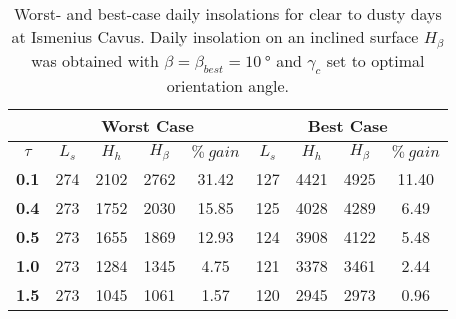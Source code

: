 \begin{table}[h]
\footnotesize
\centering
\caption[Worst- and best-case daily insolations for clear to dusty days at Ismenius Cavus]
{Worst- and best-case daily insolations for clear to dusty days at Ismenius Cavus. Daily insolation on an inclined surface $H_{\beta}$ was obtained with $\beta = \beta_{best} = \SI{10}{\degree}$ and $\gamma_{c}$ set to optimal orientation angle.}
\label{tab:insolation-ismenius-cavus-clear-and-dusty-days}
\begin{tabular}{c|c|c|c|c|c|c|c|c|}
\cline{2-9}
\multicolumn{1}{l|}{} & \multicolumn{4}{c|}{\textbf{Worst Case}} & \multicolumn{4}{c|}{\textbf{Best Case}} \\ \hline
\multicolumn{1}{|c|}{$\tau$} & $L_{s}$ & $H_{h}$ & $H_{\beta}$ & $\%\:gain$ & $L_{s}$ & $H_{h}$ & $H_{\beta}$ & $\%\:gain$ \\ \hline
\multicolumn{1}{|c|}{\textbf{0.1}} & 274 & 2102 & 2762 & 31.42 & 127 & 4421 & 4925 & 11.40 \\ \hline
\multicolumn{1}{|c|}{\textbf{0.4}} & 273 & 1752 & 2030 & 15.85 & 125 & 4028 & 4289 & 6.49 \\ \hline
\multicolumn{1}{|c|}{\textbf{0.5}} & 273 & 1655 & 1869 & 12.93 & 124 & 3908 & 4122 & 5.48 \\ \hline
\multicolumn{1}{|c|}{\textbf{1.0}} & 273 & 1284 & 1345 & 4.75 & 121 & 3378 & 3461 & 2.44 \\ \hline
\multicolumn{1}{|c|}{\textbf{1.5}} & 273 & 1045 & 1061 & 1.57 & 120 & 2945 & 2973 & 0.96 \\ \hline
\end{tabular}
\end{table}
